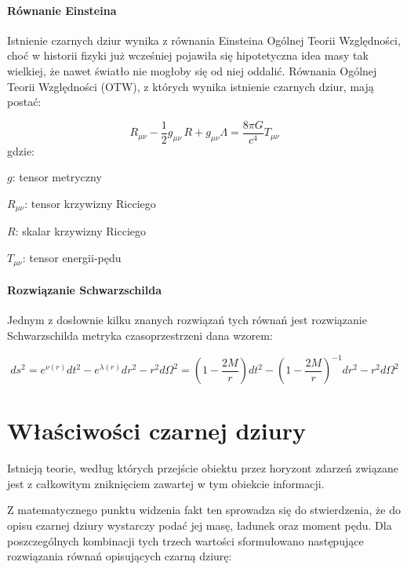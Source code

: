 \documentclass[12pt]{article}
\begin{document}
\paragraph{R\'{o}wnanie Einsteina}
Istnienie czarnych dziur wynika z r\'{o}wnania Einsteina Og\'{o}lnej Teorii Wzgl\k{e}dno\'{s}ci, cho\'{c} w historii fizyki ju\.{z} wcze\'{s}niej pojawi\l{}a si\k{e} hipotetyczna idea masy tak wielkiej, \.{z}e nawet \'{s}wiat\l{}o nie mog\l{}oby si\k{e} od niej oddali\'{c}. R\'{o}wnania Og\'{o}lnej Teorii Wzgl\k{e}dno\'{s}ci (OTW), z kt\'{o}rych wynika istnienie czarnych dziur, maj\k{a} posta\'{c}:

\begin{equation*}
R_{\mu \nu} - \frac{1}{2} g_{\mu \nu}\,R + g_{\mu \nu} \Lambda = 
 \frac{8 \pi G}{c^4} T_{\mu \nu}
\end{equation*}
gdzie:
\begin{description}
    \item $g$: tensor metryczny
    \item $R_{\mu \nu}$: tensor krzywizny Ricciego
    \item $R$: skalar krzywizny Ricciego
    \item $T_{\mu \nu}$: tensor energii-p\k{e}du
\end{description}


\paragraph{Rozwi\k{a}zanie Schwarzschilda}
Jednym z dos\l{}ownie kilku znanych rozwi\k{a}za\'{n} tych r\'{o}wna\'{n} jest rozwi\k{a}zanie Schwarzschilda \textendash{} metryka czasoprzestrzeni dana wzorem:

\begin{equation*}
ds^2 = e^{\nu(r)} dt^2 - e^{\lambda(r)} dr^2 - r^2 d\Omega^2 = \left(1 - \frac{2M}{r}\right) dt^2 - \left(1 - \frac{2M}{r}\right)^{-1}dr^2 - r^2 d\Omega^2
\end{equation*}
\newpage

\section{W\l{}a\'{s}ciwo\'{s}ci czarnej dziury}
Istniej\k{a} teorie, wed\l{}ug kt\'{o}rych przej\'{s}cie obiektu przez horyzont zdarze\'{n} zwi\k{a}zane jest z ca\l{}kowitym znikni\k{e}ciem zawartej w tym obiekcie informacji\cite{astrof}.

Z matematycznego punktu widzenia fakt ten sprowadza si\k{e} do stwierdzenia, \.{z}e do opisu czarnej dziury wystarczy poda\'{c} jej mas\k{e}, \l{}adunek oraz moment p\k{e}du\cite{relativ}. Dla poszczeg\'{o}lnych kombinacji tych trzech warto\'{s}ci sformu\l{}owano nast\k{e}puj\k{a}ce rozwi\k{a}zania r\'{o}wna\'{n} opisuj\k{a}cych czarn\k{a} dziur\k{e}:
 
\end{document}
